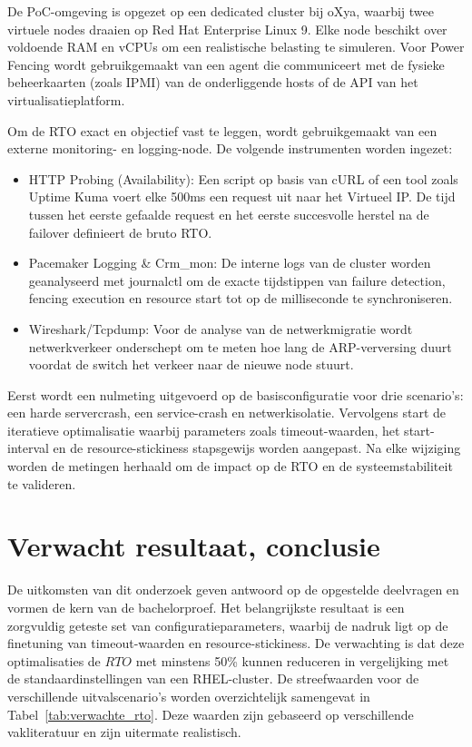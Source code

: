 De PoC-omgeving is opgezet op een dedicated cluster bij oXya, waarbij twee virtuele nodes draaien op Red Hat Enterprise Linux 9. Elke node beschikt over voldoende RAM en vCPUs om een realistische belasting te simuleren. Voor Power Fencing wordt gebruikgemaakt van een agent die communiceert met de fysieke beheerkaarten (zoals IPMI) van de onderliggende hosts of de API van het virtualisatieplatform.
\medskip

Om de RTO exact en objectief vast te leggen, wordt gebruikgemaakt van een externe monitoring- en logging-node. De volgende instrumenten worden ingezet:

\begin{itemize}
    \item HTTP Probing (Availability): Een script op basis van cURL of een tool zoals Uptime Kuma voert elke 500ms een request uit naar het Virtueel IP. De tijd tussen het eerste gefaalde request en het eerste succesvolle herstel na de failover definieert de bruto RTO.
    \item Pacemaker Logging \& Crm\_mon: De interne logs van de cluster worden geanalyseerd met journalctl om de exacte tijdstippen van failure detection, fencing execution en resource start tot op de milliseconde te synchroniseren.
    \item Wireshark/Tcpdump: Voor de analyse van de netwerkmigratie wordt netwerkverkeer onderschept om te meten hoe lang de ARP-verversing duurt voordat de switch het verkeer naar de nieuwe node stuurt.
\end{itemize}

Eerst wordt een nulmeting uitgevoerd op de basisconfiguratie voor drie scenario's: een harde servercrash, een service-crash en netwerkisolatie. Vervolgens start de iteratieve optimalisatie waarbij parameters zoals timeout-waarden, het start-interval en de resource-stickiness stapsgewijs worden aangepast. Na elke wijziging worden de metingen herhaald om de impact op de RTO en de systeemstabiliteit te valideren.


\section{Verwacht resultaat, conclusie}%
\label{sec:verwachte_resultaten}

De uitkomsten van dit onderzoek geven antwoord op de opgestelde deelvragen en vormen de kern van de bachelorproef. Het belangrijkste resultaat is een zorgvuldig geteste set van configuratieparameters, waarbij de nadruk ligt op de finetuning van timeout-waarden en resource-stickiness. De verwachting is dat deze optimalisaties de $RTO$ met minstens 50\% kunnen reduceren in vergelijking met de standaardinstellingen van een RHEL-cluster. De streefwaarden voor de verschillende uitvalscenario's worden overzichtelijk samengevat in Tabel~\ref{tab:verwachte_rto}. Deze waarden zijn gebaseerd op verschillende vakliteratuur en zijn uitermate realistisch.


